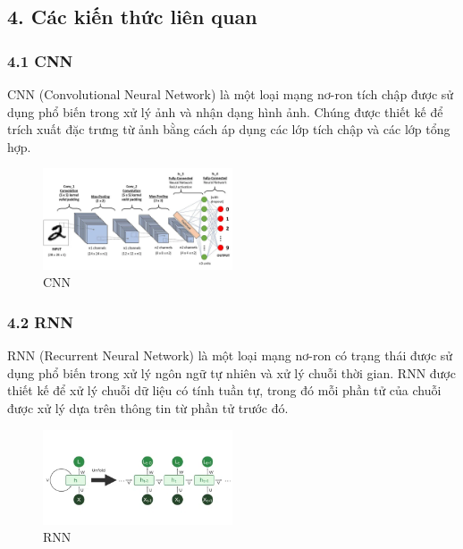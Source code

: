 \documentclass[../main.tex]{subfiles}
\begin{document}
\subsection*{4. Các kiến thức liên quan}

\subsubsection*{4.1 CNN}

CNN (Convolutional Neural Network) là một loại mạng nơ-ron tích chập được sử dụng phổ biến trong xử lý ảnh và nhận dạng hình ảnh. Chúng được thiết kế để trích xuất đặc trưng từ ảnh bằng cách áp dụng các lớp tích chập và các lớp tổng hợp.

\begin{figure}[H]
    \centering
    \includegraphics[width=0.5\textwidth]{Image/CNN.png}
    \caption{CNN}
    \label{fig:CNN}
\end{figure}

\subsubsection*{4.2 RNN}

RNN (Recurrent Neural Network) là một loại mạng nơ-ron có trạng thái được sử dụng phổ biến trong xử lý ngôn ngữ tự nhiên và xử lý chuỗi thời gian. RNN được thiết kế để xử lý chuỗi dữ liệu có tính tuần tự, trong đó mỗi phần tử của chuỗi được xử lý dựa trên thông tin từ phần tử trước đó.

\begin{figure}[H]
    \centering
    \includegraphics[width=0.5\textwidth]{Image/RNN.png}
    \caption{RNN}
    \label{fig:RNN}
\end{figure}
\end{document}
